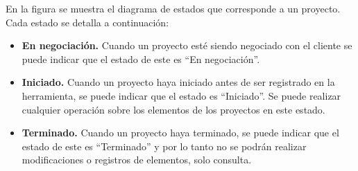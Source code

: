 En la figura  se muestra el diagrama de estados que corresponde a un proyecto. Cada estado se
detalla a continuación:


\begin{itemize}
 \item {\bf En negociación.} Cuando un proyecto esté siendo negociado con el cliente se puede indicar 
 que el estado de este es ``En negociación''. 
 \item {\bf Iniciado.} Cuando un proyecto haya iniciado antes de ser registrado en la herramienta, se puede indicar que el estado es ``Iniciado''.
 Se puede realizar cualquier operación sobre los elementos de los proyectos en este estado.
 \item {\bf Terminado.} Cuando un proyecto haya terminado, se puede indicar que el estado de este es ``Terminado'' y por lo tanto no se podrán realizar
 modificaciones o registros de elementos, solo consulta.
\end{itemize}